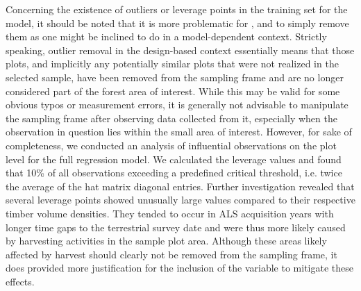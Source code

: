 

Concerning the existence of outliers or leverage points in the training set for the model, it should be noted that it is more problematic for \psmall{}, \psynth{} and \extpsynth{} to simply remove them as one might be inclined to do in a model-dependent context. Strictly speaking, outlier removal in the design-based context essentially means that those plots, and implicitly any potentially similar plots that were not realized in the selected sample, have been removed from the sampling frame and are no longer considered part of the forest area of interest. While this may be valid for some obvious typos or measurement errors, it is generally not advisable to manipulate the sampling frame after observing data collected from it, especially when the observation in question lies within the small area of interest. However, for sake of completeness, we conducted an analysis of influential observations \citep[pp. 160--167]{fahrmeir2013} on the plot level for the full regression model. We calculated the leverage values and found that 10\% of all observations exceeding a predefined critical threshold, i.e. twice the average of the hat matrix diagonal entries. Further investigation revealed that several leverage points showed unusually large \meanheight{} values compared to their respective timber volume densities. They tended to occur in ALS acquisition years with longer time gaps to the terrestrial survey date and were thus more likely caused by harvesting activities in the sample plot area.  Although these areas likely affected by harvest should clearly not be removed from the sampling frame, it does provided more justification for the inclusion of the \alsyear{} variable to mitigate these effects.

